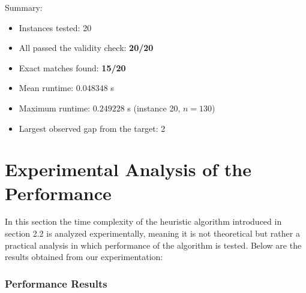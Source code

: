 \documentclass[12pt,a4paper]{article}
\theoremstyle{definition}
\begin{document}
\noindent Summary:

\begin{itemize}[noitemsep]
  \item Instances tested: 20
  \item All passed the validity check: \textbf{20/20}
  \item Exact matches found: \textbf{15/20}
  \item Mean runtime: \(0.048348\) s
  \item Maximum runtime: \(0.249228\) s (instance 20, \(n = 130\))
  \item Largest observed gap from the target: 2
\end{itemize}




\section{Experimental Analysis of the Performance}
In this section the time complexity of the heuristic algorithm introduced in section 2.2 is analyzed experimentally, meaning it is not theoretical but rather a practical analysis in which performance of the algorithm is tested. Below are the results obtained from our experimentation:

\subsubsection*{Performance Results}
\end{document}
